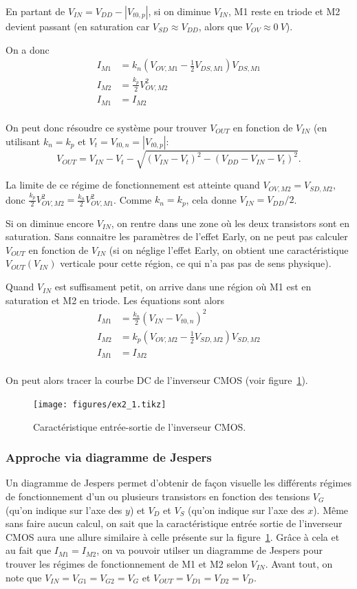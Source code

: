 \documentclass[frenchb,DIV=14]{scrartcl}
\begin{document}
En partant de $V_{IN} = V_{DD} - \left|V_{t0,p}\right|$,
si on diminue $V_{IN}$, M1 reste en triode et M2 devient passant
(en saturation car $V_{SD} \approx V_{DD}$, alors que $V_{OV} \approx \SI{0}{V}$).

On a donc
\begin{align*}
    I_{M1} &= k_n \left(V_{OV,M1}-\frac{1}{2}V_{DS,M1}\right)V_{DS,M1} \\
    I_{M2} &= \frac{k_p}{2} V_{OV,M2}^2 \\
    I_{M1} &= I_{M2} \\
\end{align*}

On peut donc résoudre ce système pour trouver $V_{OUT}$ en fonction
de $V_{IN}$ (en utilisant $k_n = k_p$ et $V_t = V_{t0,n} = |V_{t0,p}|$:
\[V_{OUT} = V_{IN}-V_t - \sqrt{(V_{IN}-V_t)^2-(V_{DD}-V_{IN}-V_t)^2}.\]

La limite de ce régime de fonctionnement est atteinte quand
$V_{OV,M2} = V_{SD,M2}$, donc $\frac{k_p}{2}V_{OV,M2}^2 = \frac{k_n}{2}V_{OV,M1}^2$.
Comme $k_n = k_p$, cela donne $V_{IN} = V_{DD}/2$.

Si on diminue encore $V_{IN}$, on rentre dans une zone où les deux transistors sont en saturation.
Sans connaitre les paramètres de l'effet Early, on ne peut pas calculer
$V_{OUT}$ en fonction de $V_{IN}$ (si on néglige l'effet Early, on
obtient une caractéristique $V_{OUT}(V_{IN})$ verticale pour cette région,
ce qui n'a pas pas de sens physique).

Quand $V_{IN}$ est suffisament petit, on arrive dans une région où
M1 est en saturation et M2 en triode.
Les équations sont alors
\begin{align*}
    I_{M1} &= \frac{k_n}{2} (V_{IN} - V_{t0,n})^2 \\
    I_{M2} &= k_p \left(V_{OV,M2}-\frac{1}{2}V_{SD,M2}\right)V_{SD,M2} \\
    I_{M1} &= I_{M2} \\
\end{align*}

On peut alors tracer la courbe DC de l'inverseur CMOS (voir figure~\ref{fig:dc-inv}).
\begin{figure}
	\centering
	\texttt{[image: figures/ex2\_1.tikz]}
	\caption{Caractéristique entrée-sortie de l'inverseur CMOS.}
	\label{fig:dc-inv}
\end{figure}

\subsubsection*{Approche via diagramme de Jespers}
Un diagramme de Jespers permet d'obtenir de façon visuelle les différents régimes
de fonctionnement d'un ou plusieurs transistors en fonction des tensions $V_G$
(qu'on indique sur l'axe des $y$) et $V_D$ et $V_S$ (qu'on indique sur l'axe des $x$).
Même sans faire aucun calcul, on sait que la caractéristique entrée sortie de l'inverseur
CMOS aura une allure similaire à celle présente sur la figure~\ref{fig:dc-inv}. Grâce à
cela et au fait que $I_{M1} = I_{M2}$, on va pouvoir utilser un diagramme de Jespers
pour trouver les régimes de fonctionnement de M1 et M2 selon $V_{IN}$. Avant tout, on note
que $V_{IN} = V_{G1} = V_{G2} = V_G$ et $V_{OUT} = V_{D1} = V_{D2} = V_D$.
\end{document}
